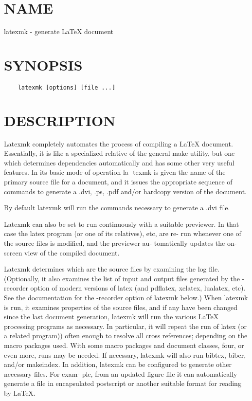  
 

\section{NAME}

latexmk - generate LaTeX document

\section{SYNOPSIS}

\begin{verbatim}
	latexmk [options] [file ...]
\end{verbatim}

\section{DESCRIPTION}

Latexmk completely automates the process of compiling a LaTeX document.
Essentially, it is like a specialized  relative  of  the  general  make
utility,  but  one  which determines dependencies automatically and has some
other very useful features.  In its basic mode  of  operation  la- texmk  is
given the name of the primary source file for a document, and it issues the
appropriate sequence of commands to generate a .dvi, .ps, .pdf and/or hardcopy
version of the document.

By  default  latexmk will run the commands necessary to generate a .dvi file.

Latexmk can also be set to run continuously with a suitable  previewer.  In
that case the latex program (or one of its relatives), etc, are re- run
whenever one of the source files is modified, and the previewer au- tomatically
updates the on-screen view of the compiled document.

Latexmk  determines  which  are  the  source files by examining the log file.
(Optionally, it also examines the list of input and output files generated  by
the  -recorder  option  of modern versions of latex (and pdflatex, xelatex,
lualatex,  etc).   See  the  documentation  for  the -recorder  option  of
latexmk below.)  When latexmk is run, it examines properties of the source
files, and if any have been changed since  the last document generation,
latexmk will run the various LaTeX processing programs as necessary.  In
particular, it will repeat the run of  latex (or  a  related program)) often
enough to resolve all cross references; depending on the macro packages used.
With  some  macro  packages  and document classes, four, or even more, runs may
be needed. If necessary, latexmk will also run bibtex, biber, and/or
makeindex.   In  addition, latexmk can be configured to generate other
necessary files.  For exam- ple, from an updated figure file it can
automatically generate  a  file in  encapsulated  postscript  or another
suitable format for reading by LaTeX.

